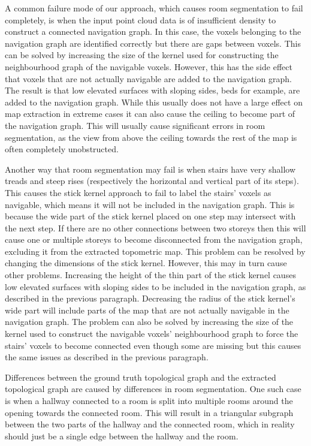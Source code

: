 A common failure mode of our approach, which causes room segmentation to fail completely, is when the input point cloud data is of insufficient density to construct a connected navigation graph. In this case, the voxels belonging to the navigation graph are identified correctly but there are gaps between voxels. This can be solved by increasing the size of the kernel used for constructing the neighbourhood graph of the navigable voxels. However, this has the side effect that voxels that are not actually navigable are added to the navigation graph. The result is that low elevated surfaces with sloping sides, beds for example, are added to the navigation graph. While this usually does not have a large effect on map extraction in extreme cases it can also cause the ceiling to become part of the navigation graph. This will usually cause significant errors in room segmentation, as the view from above the ceiling towards the rest of the map is often completely unobstructed.

Another way that room segmentation may fail is when stairs have very shallow treads and steep rises (respectively the horizontal and vertical part of its steps). This causes the stick kernel approach to fail to label the stairs' voxels as navigable, which means it will not be included in the navigation graph. This is because the wide part of the stick kernel placed on one step may intersect with the next step. If there are no other connections between two storeys then this will cause one or multiple storeys to become disconnected from the navigation graph, excluding it from the extracted topometric map. This problem can be resolved by changing the dimensions of the stick kernel. However, this may in turn cause other problems. Increasing the height of the thin part of the stick kernel causes low elevated surfaces with sloping sides to be included in the navigation graph, as described in the previous paragraph. Decreasing the radius of the stick kernel's wide part will include parts of the map that are not actually navigable in the navigation graph. The problem can also be solved by increasing the size of the kernel used to construct the navigable voxels' neighbourhood graph to force the stairs'  voxels to become connected even though some are missing but this causes the same issues as described in the previous paragraph.

Differences between the ground truth topological graph and the extracted topological graph are caused by differences in room segmentation. One such case is when a hallway connected to a room is split into multiple rooms around the opening towards the connected room. This will result in a triangular subgraph between the two parts of the hallway and the connected room, which in reality should just be a single edge between the hallway and the room. 

